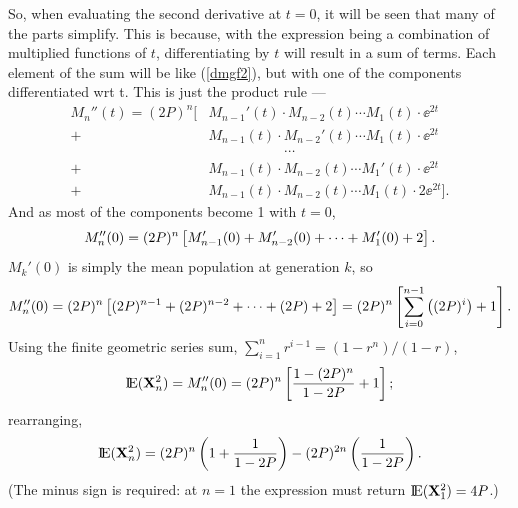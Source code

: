 So, when evaluating the second derivative at $t=0$, it will be seen that many of the parts simplify. This is because, with the expression being a combination of multiplied functions of $t$, differentiating by $t$ will result in a sum of terms. Each element of the sum will be like (\ref{dmgf2}), but with one of the components differentiated wrt t. This is just the product rule ---
\begin{align*}
M_n''(t) = (2P)^n\bigg[  &M_{n-1}'(t)  \cdot  M_{n-2}(t)  \cdots M_{1}(t)  \cdot \ee^{2t} \\
+ &M_{n-1}(t)  \cdot  M_{n-2}'(t)  \cdots M_{1}(t)  \cdot \ee^{2t} \\
&\hspace{65pt}\cdots\\
+ &M_{n-1}(t)  \cdot  M_{n-2}(t)  \cdots M_{1}'(t)  \cdot \ee^{2t} \\
+ &M_{n-1}(t)  \cdot  M_{n-2}(t)  \cdots M_{1}(t)  \cdot 2\ee^{2t} \bigg].
\end{align*}
And as most of the components become 1 with $t=0$,
\begin{equation*}
M_n''(0) = (2P)^n\left[ M_{n-1}'(0) + M_{n-2}'(0) + \cdots + M_1'(0) + 2\right].
\end{equation*}
$M_k'(0)$ is simply the mean population at generation $k$, so
\begin{equation*}
M_n''(0) = (2P)^n\left[(2P)^{n-1} + (2P)^{n-2} + \cdots + (2P) + 2\right] = (2P)^n\left[\sum^{n-1}_{i = 0}\left((2P)^i\right) + 1\right].
\end{equation*}
Using the finite geometric series sum, $\sum_{i=1}^n r^{i-1} = (1-r^n)/(1-r)$, 
\begin{equation*}
{\rm I}\!{\rm E}({\bf X}_n^2) = M_n''(0) = (2P)^n\left[\frac{1-(2P)^n}{1-2P} + 1\right];
\end{equation*}
rearranging,
\begin{equation}
\label{secondMoment}
{\rm I}\!{\rm E}({\bf X}_n^2)  = (2P)^n\left(1 + \frac{1}{1-2P}\right) - (2P)^{2n}\left(\frac{1}{1-2P}\right).
\end{equation}
(The minus sign is required: at $n=1$ the expression must return ${\rm I}\!{\rm E}({\bf X}_1^2)=4P$.)



